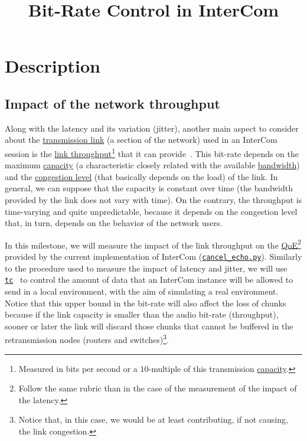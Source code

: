 
\title{Bit-Rate Control in InterCom}


\maketitle

\tableofcontents

\section{Description}
\subsection{Impact of the network throughput}
Along with the latency and its variation (jitter), another main aspect
to consider about the
\href{https://en.wikipedia.org/wiki/Telecommunications_link}{transmission
  link} (a section of the network) used in an InterCom session is the
\href{https://en.wikipedia.org/wiki/Channel_capacityhttps://en.wikipedia.org/wiki/Network_throughput}{link
  throughput}\footnote{Measured in bits per second or a $10$-multiple
  of this transmission
  \href{https://en.wikipedia.org/wiki/Bandwidth_(computing)}{capacity}.}
that it can provide~\cite{Forouzan,Tanenbaum}. This bit-rate depends on
the maximum
\href{https://en.wikipedia.org/wiki/Channel_capacity}{capacity} (a
characteristic closely related with the available
\href{https://en.wikipedia.org/wiki/Bandwidth_(signal_processing)}{bandwidth})
and the
\href{https://en.wikipedia.org/wiki/Network_congestion}{congestion
  level} (that basically depends on the load) of the link. In general,
we can suppose that the capacity is constant over time (the
bandwidth provided by the link does not vary with time). On the
contrary, the throughput is time-varying and quite unpredictable,
because it depends on the congestion level that, in turn, depends
on the behavior of the network users.

In this milestone, we will measure the impact of the link throughput
on the
\href{https://en.wikipedia.org/wiki/Quality_of_experience}{QoE}\footnote{Follow
  the same rubric than in the case of the measurement of the impact of
  the latency.} provided by the current implementation of InterCom
(\href{https://github.com/Tecnologias-multimedia/InterCom/blob/master/src/cancel_echo.py}{\texttt{cancel\_echo.py}}). Similarly
to the procedure used to measure the impact of latency and jitter, we
will use
\href{https://man7.org/linux/man-pages/man8/tc.8.html}{\texttt{tc}}~\cite{bert2012lartc}
to control the amount of data that an InterCom instance will be
allowed to send in a local environment, with the aim of simulating a
real environment. Notice that this upper bound in the bit-rate will
also affect the loss of chunks because if the link capacity is smaller
than the audio bit-rate (throughput), sooner or later the link will
discard those chunks that cannot be buffered in the retransmission
nodes (routers and switches)\footnote{Notice that, in this case, we
  would be at least contributing, if not causing, the link
  congestion.}.

